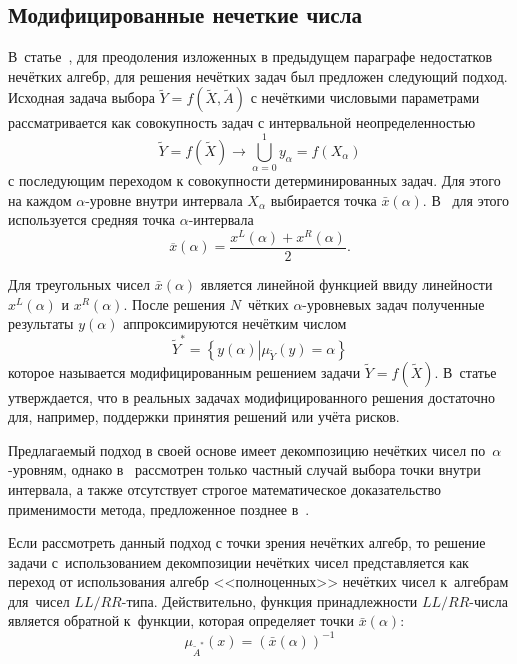 \subsection{Модифицированные нечеткие числа}

В~статье~\cite{Lebedev}, для преодоления изложенных в предыдущем параграфе недостатков нечётких алгебр, для решения нечётких задач был предложен следующий подход. Исходная задача выбора $\tilde{Y}=f\left( \tilde X, \tilde A \right)$ с нечёткими числовыми параметрами рассматривается как совокупность задач с интервальной неопределенностью
\begin{equation}
\label{eq:alpha-equivalence}
	\tilde{Y} = f\left( \tilde X \right)\to \bigcup\limits_{\alpha =0}^{1}{y_\alpha}=f\left( X_\alpha \right)
\end{equation}
с последующим переходом к совокупности детерминированных задач. Для этого на каждом $\alpha$-уровне внутри интервала $X_\alpha$ выбирается точка $\bar{x}\left( \alpha  \right)$. В~\cite{Lebedev} для этого используется средняя точка $\alpha$-интервала
\begin{equation}
  \label{eq:L-transform-midpoint}
  \overline{x}\left( \alpha  \right)=\frac{x^L\left( \alpha  \right)+x^R\left( \alpha  \right)}{2}.
\end{equation}

Для треугольных чисел $\bar{x}\left( \alpha  \right)$ является линейной функцией ввиду линейности $x^L\left( \alpha  \right)$ и $x^R\left( \alpha  \right)$. После решения $N$~чётких $\alpha $-уровневых задач полученные результаты $y\left( \alpha  \right)$ аппроксимируются нечётким числом
\begin{equation*}
  \tilde Y^{*}=\left\{ y(\alpha )\left| \mu_{\tilde Y}(y)=\alpha \right. \right\}
\end{equation*}
которое называется модифицированным решением задачи $\tilde{Y}=f\left( \tilde X \right)$. В~статье утверждается, что в реальных задачах модифицированного решения достаточно для, например, поддержки принятия решений или учёта рисков. 

Предлагаемый подход в своей основе имеет декомпозицию нечётких чисел по~$\alpha$-уровням, однако в~\cite{Lebedev} рассмотрен только частный случай выбора точки внутри интервала, а также отсутствует строгое математическое доказательство применимости метода, предложенное позднее в~\cite{Vorontsov_PI}.

Если рассмотреть данный подход с точки зрения нечётких алгебр, то решение задачи с~использованием декомпозиции нечётких чисел представляется как переход от использования алгебр <<полноценных>> нечётких чисел к~алгебрам для~чисел $LL/RR$-типа. Действительно, функция принадлежности $LL/RR$-числа является обратной к~функции, которая определяет точки $\bar{x}\left(\alpha \right)$:
\begin{equation}
\label{eq:modified-inverse-function}
  \mu_{\tilde A^{*}}\left( x \right)={\left( \bar{x}\left( \alpha  \right) \right)}^{-1}
\end{equation}

